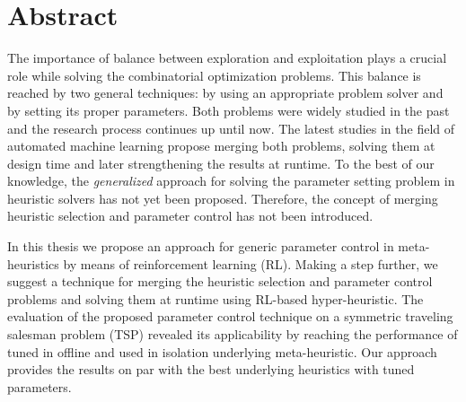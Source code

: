 \newpage
\section*{Abstract}
The importance of balance between exploration and exploitation plays a crucial role while solving the combinatorial optimization problems. This balance is reached by two general techniques: by using an appropriate problem solver and by setting its proper parameters. Both problems were widely studied in the past and the research process continues up until now. The latest studies in the field of automated machine learning propose merging both problems, solving them at design time and later strengthening the results at runtime. To the best of our knowledge, the \emph{generalized} approach for solving the parameter setting problem in heuristic solvers has not yet been proposed. Therefore, the concept of merging heuristic selection and parameter control has not been introduced.

In this thesis we propose an approach for generic parameter control in meta-heuristics by means of reinforcement learning (RL). Making a step further, we suggest a technique for merging the heuristic selection and parameter control problems and solving them at runtime using RL-based hyper-heuristic. The evaluation of the proposed parameter control technique on a symmetric traveling salesman problem (TSP) revealed its applicability by reaching the performance of tuned in offline and used in isolation underlying meta-heuristic. Our approach provides the results on par with the best underlying heuristics with tuned parameters.